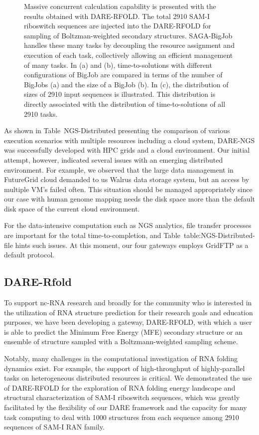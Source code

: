 \documentclass{sig-alternate}
\begin{document}
\begin{figure}
\caption{\small Massive concurrent calculation capability is presented with the results obtained with DARE-RFOLD. The total 2910 SAM-I riboswitch sequences are injected into the DARE-RFOLD for sampling of Boltzman-weighted secondary structures.  SAGA-BigJob handles these many tasks by decoupling the resource assignment and execution of each task, collectively allowing an efficient management of many tasks. In (a) and (b), time-to-solutions with different configurations of BigJob are compared in terms of the number of BigJobs (a) and the size of a BigJob (b).  In (c), the distribution of sizes of 2910 input sequences is illustrated.  This distribution is directly associated with the distribution of time-to-solutions of all 2910 tasks.}
  \label{fig:dare-rfold-result} 
\end{figure}

As shown in Table~{NGS-Distributed} presenting the comparison of various execution scenarios with multiple resources including a cloud system, DARE-NGS was successfully developed with HPC grids and a cloud environment.  Our initial attempt, however, indicated several issues with an emerging distributed environment.  For example,  we observed that the large data management in FutureGrid cloud demanded to us Walrus data storage system, but an access by multiple VM's failed often.  This situation should be managed appropriately since our case with human genome mapping needs the disk space more than the default disk space of the current cloud environment.

For the data-intensive computation such as NGS analytics, file transfer processes are important for the total time-to-completion, and Table~{table:NGS-Distributed-file} hints such issues.  At this moment, our four gateways employs GridFTP as a default protocol.



\subsection{DARE-Rfold}
To support nc-RNA research and broadly for the community who is interested in the utilization of RNA structure prediction for their research goals and education purposes, we have been developing a gateway, DARE-RFOLD, with which a user is able to predict the Minimum Free Energy (MFE) secondary structure or an ensemble of structure sampled with a Boltzmann-weighted sampling scheme.  

Notably, many challenges in the computational investigation of RNA folding dynamics exist.  For example, the support of high-throughput of highly-parallel tasks on heterogeneous distributed resources is critical.
We demonstrated the use of DARE-RFOLD for the exploration of RNA folding energy landscape and structural characterization of SAM-I riboswitch sequences, which was greatly facilitated by the flexibility of our DARE framework and the capacity for many task computing to deal with 1000 structures from each sequence among 2910 sequences of SAM-I RAN family\cite{ecmls10}. 
\end{document}
